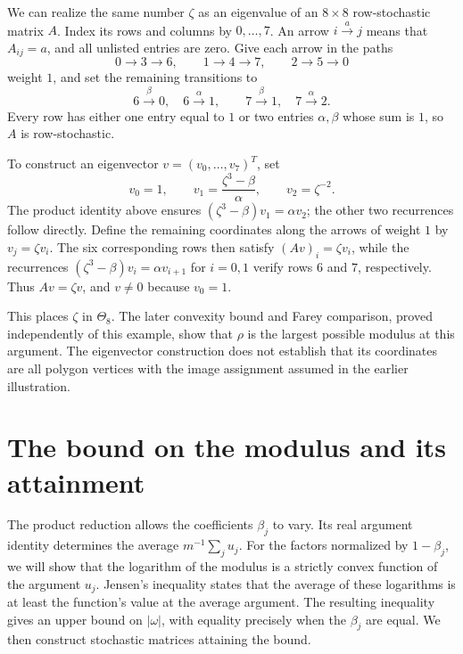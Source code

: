 \documentclass[11pt,a4paper]{article}
\theoremstyle{definition}
\theoremstyle{remark}
\numberwithin{equation}{section}
\begin{document}
We can realize the same number $\zeta$ as an eigenvalue of an $8\times8$ row-stochastic matrix $A$. Index its rows and columns by $0,\ldots,7$. An arrow $i\xrightarrow{a}j$ means that $A_{ij}=a$, and all unlisted entries are zero. Give each arrow in the paths
\[
 0\longrightarrow3\longrightarrow6,\qquad
 1\longrightarrow4\longrightarrow7,\qquad
 2\longrightarrow5\longrightarrow0
\]
weight $1$, and set the remaining transitions to
\[
 6\xrightarrow{\beta}0,\quad6\xrightarrow{\alpha}1,
 \qquad
 7\xrightarrow{\beta}1,\quad7\xrightarrow{\alpha}2.
\]
Every row has either one entry equal to $1$ or two entries $\alpha,\beta$ whose sum is $1$, so $A$ is row-stochastic.

To construct an eigenvector $v=(v_0,\ldots,v_7)^T$, set
\[
 v_0=1,\qquad v_1=\frac{\zeta^3-\beta}{\alpha},
 \qquad v_2=\zeta^{-2}.
\]
The product identity above ensures $(\zeta^3-\beta)v_1=\alpha v_2$; the other two recurrences follow directly. Define the remaining coordinates along the arrows of weight $1$ by $v_j=\zeta v_i$. The six corresponding rows then satisfy $(Av)_i=\zeta v_i$, while the recurrences $(\zeta^3-\beta)v_i=\alpha v_{i+1}$ for $i=0,1$ verify rows $6$ and $7$, respectively. Thus $Av=\zeta v$, and $v\ne0$ because $v_0=1$.

This places $\zeta$ in $\Theta_8$. The later convexity bound and Farey comparison, proved independently of this example, show that $\rho$ is the largest possible modulus at this argument. The eigenvector construction does not establish that its coordinates are all polygon vertices with the image assignment assumed in the earlier illustration.



\section{The bound on the modulus and its attainment}
The product reduction allows the coefficients $\beta_j$ to vary. Its real argument identity determines the average $m^{-1}\sum_j u_j$. For the factors normalized by $1-\beta_j$, we will show that the logarithm of the modulus is a strictly convex function of the argument $u_j$. Jensen's inequality states that the average of these logarithms is at least the function's value at the average argument. The resulting inequality gives an upper bound on $|\omega|$, with equality precisely when the $\beta_j$ are equal. We then construct stochastic matrices attaining the bound.
\end{document}
